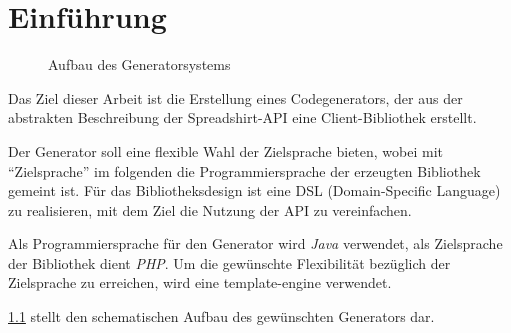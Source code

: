 \chapter{Einführung}


\begin{figure}[htb]
    \centering
    \resizebox{\textwidth}{!}{
        
    }
    \caption{Aufbau des Generatorsystems}
    \label{fig:generatorstructure}
\end{figure}        

Das Ziel dieser Arbeit ist die Erstellung eines Codegenerators, der aus der abstrakten Beschreibung der Spreadshirt-API eine Client-Bibliothek erstellt.

Der Generator soll eine flexible Wahl der Zielsprache bieten, wobei mit \enquote{Zielsprache} im folgenden die Programmiersprache der erzeugten Bibliothek gemeint ist. 
Für das Bibliotheksdesign ist eine \gls{DSL} (Domain-Specific Language) zu realisieren, mit dem Ziel die Nutzung der \gls{API} zu vereinfachen. 

Als Programmiersprache für den Generator wird \emph{Java} verwendet, als Zielsprache der Bibliothek dient \emph{PHP}. 
Um die gewünschte Flexibilität bezüglich der Zielsprache zu erreichen, wird eine \gls{template-engine} verwendet.

\cref{fig:generatorstructure} stellt den schematischen Aufbau des gewünschten Generators dar.




